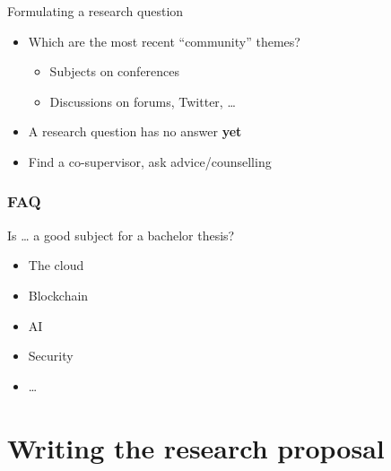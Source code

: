 \documentclass[aspectratio=169]{beamer}
\begin{document}
    \begin{frame}{Formulating a research question}
        
        \begin{itemize}
            \item Which are the most recent ``community'' themes?
            \begin{itemize}
                \item Subjects on conferences
                \item Discussions on forums, Twitter, \ldots
            \end{itemize}
            \item A research question has no answer \textbf{yet} 
            \item Find a co-supervisor, ask advice/counselling
        \end{itemize}
        
    \end{frame}
    
    \begin{frame}[plain]
        \frametitle{FAQ}
        
        Is \ldots{} a good subject for a bachelor thesis?
        
        \begin{itemize}
            \item The cloud
            \item Blockchain
            \item AI
            \item Security
            \item \ldots
        \end{itemize}
        
        \bigskip
        
    \end{frame}
    
    \section{Writing the research proposal}
    
\end{document}
